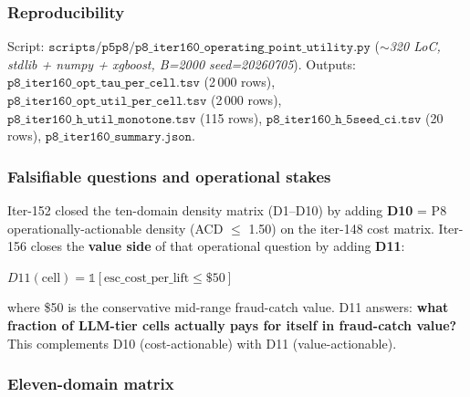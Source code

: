 \documentclass{article}
\begin{document}
\subsubsection{Reproducibility}

Script: $\texttt{scripts/p5p8/p8\_iter160\_operating\_point\_utility.py}$
(\textit{$\sim$320 LoC, stdlib + numpy + xgboost, B=2000 seed=20260705}).
Outputs:
$\texttt{p8\_iter160\_opt\_tau\_per\_cell.tsv}$ (2\,000 rows),
$\texttt{p8\_iter160\_opt\_util\_per\_cell.tsv}$ (2\,000 rows),
$\texttt{p8\_iter160\_h\_util\_monotone.tsv}$ (115 rows),
$\texttt{p8\_iter160\_h\_5seed\_ci.tsv}$ (20 rows),
$\texttt{p8\_iter160\_summary.json}$.
 

\subsubsection{Falsifiable questions and operational stakes}
Iter-152 closed the ten-domain density matrix (D1--D10) by adding
\textbf{D10} = P8 operationally-actionable density
(ACD $\leq$ 1.50) on the iter-148 cost matrix.  Iter-156 closes the
\textbf{value side} of that operational question by adding \textbf{D11}:

  $D11(\text{cell}) = \mathbb{1}[\text{esc\_cost\_per\_lift} \leq \$50]$

where \$50 is the conservative mid-range fraud-catch value.  D11
answers: \textbf{what fraction of LLM-tier cells actually pays for
itself in fraud-catch value?}  This complements D10 (cost-actionable)
with D11 (value-actionable).

\subsubsection{Eleven-domain matrix}
\end{document}
